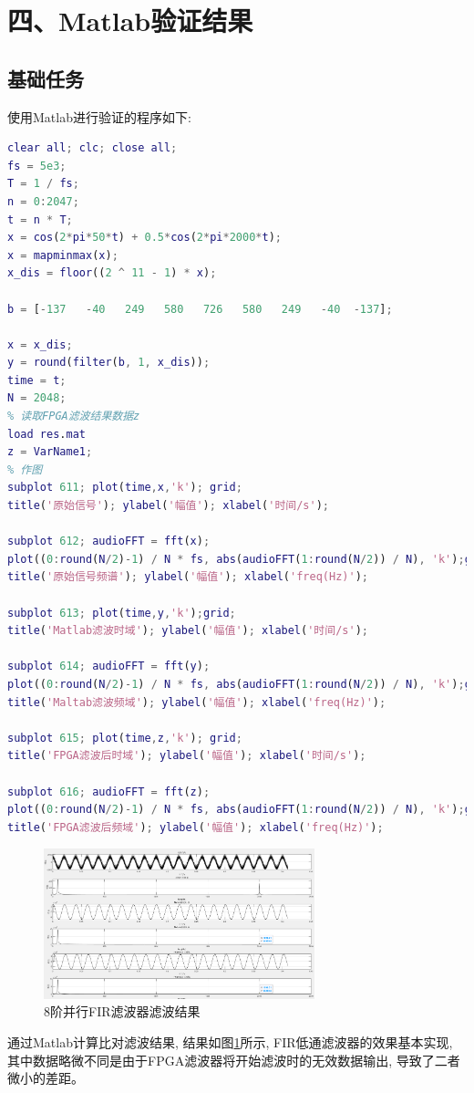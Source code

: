 \documentclass{article}
\newcommand{\fourhao}{\fontsize{14pt}{\baselineskip}\selectfont} %
\newcommand{\xiaosihao}{\fontsize{12pt}{\baselineskip}\selectfont} %
\begin{document}
\section*{\fourhao 四、Matlab验证结果}
\xiaosihao
{}
\subsection*{基础任务}
使用Matlab进行验证的程序如下:
\begin{lstlisting}[language=Matlab, caption={基础任务Matlab验证结果}]
clear all; clc; close all;
fs = 5e3;
T = 1 / fs;
n = 0:2047;
t = n * T;
x = cos(2*pi*50*t) + 0.5*cos(2*pi*2000*t);
x = mapminmax(x);
x_dis = floor((2 ^ 11 - 1) * x);

b = [-137   -40   249   580   726   580   249   -40  -137];

x = x_dis;
y = round(filter(b, 1, x_dis));
time = t;
N = 2048;
% 读取FPGA滤波结果数据z
load res.mat
z = VarName1;
% 作图
subplot 611; plot(time,x,'k'); grid;
title('原始信号'); ylabel('幅值'); xlabel('时间/s');

subplot 612; audioFFT = fft(x);
plot((0:round(N/2)-1) / N * fs, abs(audioFFT(1:round(N/2)) / N), 'k');grid;
title('原始信号频谱'); ylabel('幅值'); xlabel('freq(Hz)');

subplot 613; plot(time,y,'k');grid;
title('Matlab滤波时域'); ylabel('幅值'); xlabel('时间/s');

subplot 614; audioFFT = fft(y);
plot((0:round(N/2)-1) / N * fs, abs(audioFFT(1:round(N/2)) / N), 'k');grid;
title('Maltab滤波频域'); ylabel('幅值'); xlabel('freq(Hz)');

subplot 615; plot(time,z,'k'); grid;
title('FPGA滤波后时域'); ylabel('幅值'); xlabel('时间/s');

subplot 616; audioFFT = fft(z);
plot((0:round(N/2)-1) / N * fs, abs(audioFFT(1:round(N/2)) / N), 'k');grid;
title('FPGA滤波后频域'); ylabel('幅值'); xlabel('freq(Hz)');
\end{lstlisting}
\begin{figure}[htbp]
    \centering
    \includegraphics[width=0.7\textwidth]{image/2024-06-28-21-18-48.png}
    \caption{8阶并行FIR滤波器滤波结果}
    \label{image_verify_base_1}
\end{figure}
通过Matlab计算比对滤波结果, 结果如图\ref{image_verify_base_1}所示, FIR低通滤波器的效果基本实现, 
其中数据略微不同是由于FPGA滤波器将开始滤波时的无效数据输出, 导致了二者微小的差距。
\end{document}
